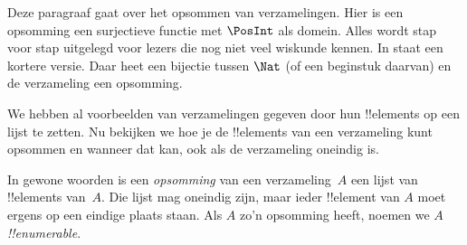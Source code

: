 \documentclass[../../../include/open-logic-section]{subfiles}
\begin{document}


\begin{editorial}
  Deze paragraaf gaat over het opsommen van verzamelingen. Hier is een
  opsomming een surjectieve functie met $\PosInt$ als domein. Alles wordt
  stap voor stap uitgelegd voor lezers die nog
  niet veel wiskunde kennen. In  staat een kortere
  versie. Daar heet een bijectie tussen $\Nat$ (of een beginstuk
  daarvan) en de verzameling een opsomming.
\end{editorial}

\begin{explain}
We hebben al voorbeelden van verzamelingen gegeven door hun
!!{element}s op een lijst te zetten. Nu bekijken we hoe je de
!!{element}s van een verzameling kunt opsommen en wanneer dat kan,
ook als de verzameling oneindig is.
\end{explain}

\begin{defn}
In gewone woorden is een \emph{opsomming} van een verzameling~$A$ een
lijst van !!{element}s van~$A$. Die lijst mag oneindig zijn, maar ieder
!!{element} van $A$ moet ergens op een eindige plaats staan. Als $A$
zo'n opsomming heeft, noemen we $A$ \emph{!!{enumerable}}.
\end{defn}
\end{document}
